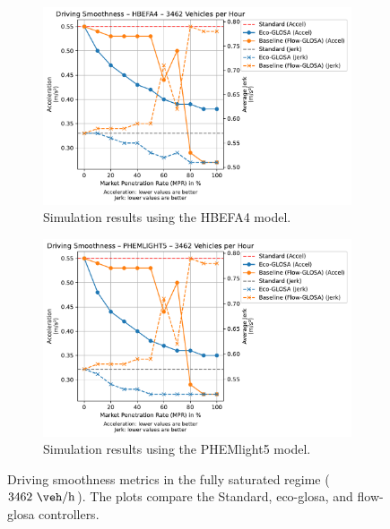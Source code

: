 \begin{figure}[htb]
  \centering
  \begin{subfigure}[b]{0.45\textwidth}
    \includegraphics[width=\textwidth]{data/img/DrivingSmoothness/DrivingSmoothness_HBEFA4_Cars3462.pdf}
    \caption{Simulation results using the HBEFA4 model.}
    \label{fig:Smoothness_HBEFA4_3462}
  \end{subfigure}\hfill
  \begin{subfigure}[b]{0.45\textwidth}
    \includegraphics[width=\textwidth]{data/img/DrivingSmoothness/DrivingSmoothness_PHEMLIGHT5_Cars3462.pdf}
    \caption{Simulation results using the PHEMlight5 model.}
    \label{fig:Smoothness_PHEMlight5_3462}
  \end{subfigure}
  \caption[Driving smoothness metrics at $3462~\unit{\veh\per\hour}$]{Driving smoothness metrics in the fully saturated regime ($3462~\unit{\veh\per\hour}$). The plots compare the Standard, \ac{eco-glosa}, and \ac{flow-glosa} controllers.}
  \label{fig:Smoothness_3462}
\end{figure}

